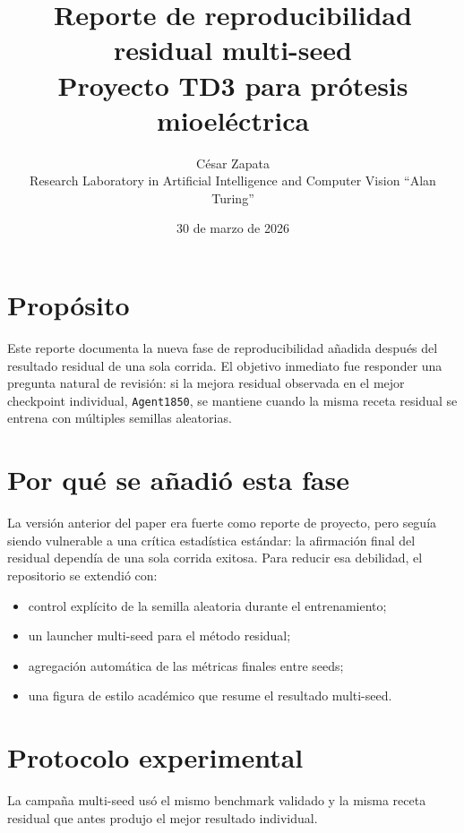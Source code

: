 \documentclass[11pt,a4paper]{article}
\title{Reporte de reproducibilidad residual multi-seed\\\large Proyecto TD3 para pr\'otesis mioel\'ectrica}
\author{C\'esar Zapata\\Research Laboratory in Artificial Intelligence and Computer Vision ``Alan Turing''}
\date{30 de marzo de 2026}
\begin{document}
\maketitle

\section*{Prop\'osito}
Este reporte documenta la nueva fase de reproducibilidad a\~nadida despu\'es del resultado residual de una sola corrida. El objetivo inmediato fue responder una pregunta natural de revisi\'on: si la mejora residual observada en el mejor checkpoint individual, \texttt{Agent1850}, se mantiene cuando la misma receta residual se entrena con m\'ultiples semillas aleatorias.

\section*{Por qu\'e se a\~nadi\'o esta fase}
La versi\'on anterior del paper era fuerte como reporte de proyecto, pero segu\'ia siendo vulnerable a una cr\'itica estad\'istica est\'andar: la afirmaci\'on final del residual depend\'ia de una sola corrida exitosa. Para reducir esa debilidad, el repositorio se extendi\'o con:
\begin{itemize}
    \item control expl\'icito de la semilla aleatoria durante el entrenamiento;
    \item un launcher multi-seed para el m\'etodo residual;
    \item agregaci\'on autom\'atica de las m\'etricas finales entre seeds;
    \item una figura de estilo acad\'emico que resume el resultado multi-seed.
\end{itemize}

\section*{Protocolo experimental}
La campa\~na multi-seed us\'o el mismo benchmark validado y la misma receta residual que antes produjo el mejor resultado individual.
\end{document}

